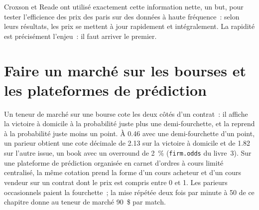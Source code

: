 \begin{omfigure}

\label{fig:hf:prediction-and-sports-market-making:match}
\end{omfigure}

Croxson et Reade ont utilisé exactement cette information nette, un but, pour tester l'efficience des prix des paris sur des données à haute fréquence~: selon leurs
résultats, les prix se mettent à jour rapidement et intégralement. La rapidité est précisément l'enjeu~: il faut arriver le premier.

\section{Faire un marché sur les bourses et les plateformes de prédiction}

Un teneur de marché sur une bourse cote les deux côtés d'un contrat~: il affiche la victoire à domicile à la probabilité juste plus une demi-fourchette, et la reprend à la
probabilité juste moins un point. À 0.46 avec une demi-fourchette d'un point, un parieur obtient une cote décimale de 2.13 sur la victoire à domicile et de 1.82 sur l'autre issue, un
book avec un overround de 2~\% (\texttt{firm.odds} du livre~3). Sur une plateforme de prédiction organisée en carnet d'ordres à cours limité centralisé, la même cotation prend la forme d'un cours acheteur
et d'un cours vendeur sur un contrat dont le prix est compris entre 0 et 1. Les parieurs occasionnels paient la fourchette~; la mise répétée deux fois par minute à 50 de ce chapitre donne au
teneur de marché 90~\$ par match.

